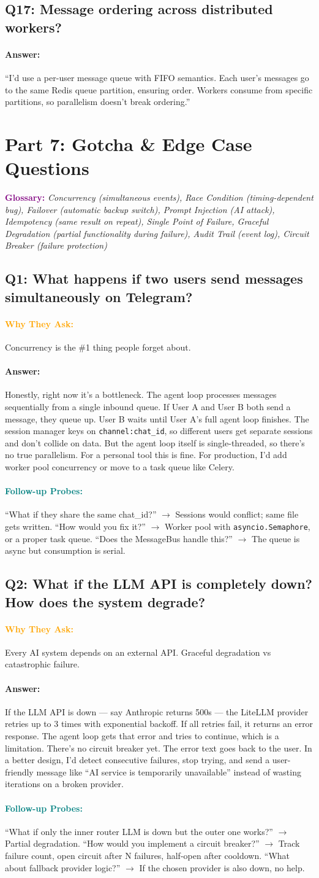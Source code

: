 \documentclass[11pt,a4paper]{article}
\newcommand{\Q}[1]{\subsection{#1}}
\newcommand{\Ans}[1]{\paragraph{\textbf{Answer:}} #1}
\newcommand{\Why}{\paragraph{\textcolor{orange}{\textbf{Why They Ask:}}}}
\newcommand{\Probe}{\paragraph{\textcolor{teal}{\textbf{Follow-up Probes:}}}}
\begin{document}
\Q{Q17: Message ordering across distributed workers?}
\Ans ``I'd use a per-user message queue with FIFO semantics. Each user's messages go to the same Redis queue partition, ensuring order. Workers consume from specific partitions, so parallelism doesn't break ordering.''

\newpage
\section{Part 7: Gotcha \& Edge Case Questions}

\textcolor{purple}{\textbf{Glossary:}} \textit{Concurrency (simultaneous events), Race Condition (timing-dependent bug), Failover (automatic backup switch), Prompt Injection (AI attack), Idempotency (same result on repeat), Single Point of Failure, Graceful Degradation (partial functionality during failure), Audit Trail (event log), Circuit Breaker (failure protection)}

\Q{Q1: What happens if two users send messages simultaneously on Telegram?}
\Why Concurrency is the \#1 thing people forget about.
\Ans Honestly, right now it's a bottleneck. The agent loop processes messages sequentially from a single inbound queue. If User A and User B both send a message, they queue up. User B waits until User A's full agent loop finishes. The session manager keys on \texttt{channel:chat\_id}, so different users get separate sessions and don't collide on data. But the agent loop itself is single-threaded, so there's no true parallelism. For a personal tool this is fine. For production, I'd add worker pool concurrency or move to a task queue like Celery.
\Probe ``What if they share the same chat\_id?'' $\rightarrow$ Sessions would conflict; same file gets written. ``How would you fix it?'' $\rightarrow$ Worker pool with \texttt{asyncio.Semaphore}, or a proper task queue. ``Does the MessageBus handle this?'' $\rightarrow$ The queue is async but consumption is serial.

\Q{Q2: What if the LLM API is completely down? How does the system degrade?}
\Why Every AI system depends on an external API. Graceful degradation vs catastrophic failure.
\Ans If the LLM API is down --- say Anthropic returns 500s --- the LiteLLM provider retries up to 3 times with exponential backoff. If all retries fail, it returns an error response. The agent loop gets that error and tries to continue, which is a limitation. There's no circuit breaker yet. The error text goes back to the user. In a better design, I'd detect consecutive failures, stop trying, and send a user-friendly message like ``AI service is temporarily unavailable'' instead of wasting iterations on a broken provider.
\Probe ``What if only the inner router LLM is down but the outer one works?'' $\rightarrow$ Partial degradation. ``How would you implement a circuit breaker?'' $\rightarrow$ Track failure count, open circuit after N failures, half-open after cooldown. ``What about fallback provider logic?'' $\rightarrow$ If the chosen provider is also down, no help.
\end{document}
